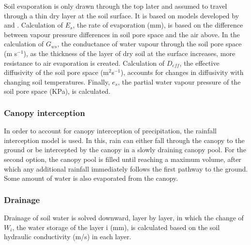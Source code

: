 \documentclass[final,3p,times,authoryear]{elsarticle}
\begin{document}
Soil evaporation is only drawn through the top later and assumed to travel through a thin dry layer at the soil surface. It is based on models developed by \cite{Choudhury1988} and \cite{Williams2001}. Calculation of $E_{s}$, the rate of evaporation (mm), is based on the difference between vapour pressure differences in soil pore space and the air above. In the calculation of $G_{ws}$, the conductance of water vapour through the soil pore space (m s$^{-1}$), as the thickness of the layer of dry soil at the surface increases, more resistance to air evaporation is created. Calculation of $D_{eff}$, the effective diffusivity of the soil pore space (m$^{2}$s$^{-1}$), accounts for changes in diffusivity with changing soil temperatures. Finally, $e_{s}$, the partial water vapour pressure of the soil pore space (KPa), is calculated. 




\subsubsection{Canopy interception}
In order to account for canopy interception of precipitation, the \cite{Rutter1975} rainfall interception model is used. In this, rain can either fall through the canopy to the ground or be intercepted by the canopy in a slowly draining canopy pool. For the second option, the canopy pool is filled until reaching a maximum volume, after which any additional rainfall immediately follows the first pathway to the ground. Some amount of water is also evaporated from the canopy. 




\subsubsection{Drainage}

Drainage of soil water is solved downward, layer by layer, in which the change of $W_{i}$, the water storage of the layer i (mm), is calculated based on the soil hydraulic conductivity (m/s) in each layer.

\end{document}
